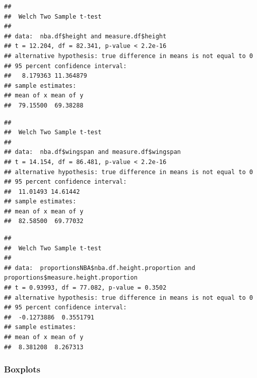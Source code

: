 \documentclass[]{article}
\newenvironment{Shaded}{\begin{snugshade}}{\end{snugshade}}
\newcommand{\DataTypeTok}[1]{\textcolor[rgb]{0.13,0.29,0.53}{#1}}
\newcommand{\KeywordTok}[1]{\textcolor[rgb]{0.13,0.29,0.53}{\textbf{#1}}}
\newcommand{\NormalTok}[1]{#1}
\newcommand{\OperatorTok}[1]{\textcolor[rgb]{0.81,0.36,0.00}{\textbf{#1}}}
\newcommand{\OtherTok}[1]{\textcolor[rgb]{0.56,0.35,0.01}{#1}}
\begin{document}
\begin{verbatim}
## 
##  Welch Two Sample t-test
## 
## data:  nba.df$height and measure.df$height
## t = 12.204, df = 82.341, p-value < 2.2e-16
## alternative hypothesis: true difference in means is not equal to 0
## 95 percent confidence interval:
##   8.179363 11.364879
## sample estimates:
## mean of x mean of y 
##  79.15500  69.38288
\end{verbatim}

\begin{Shaded}
\end{Shaded}

\begin{verbatim}
## 
##  Welch Two Sample t-test
## 
## data:  nba.df$wingspan and measure.df$wingspan
## t = 14.154, df = 86.481, p-value < 2.2e-16
## alternative hypothesis: true difference in means is not equal to 0
## 95 percent confidence interval:
##  11.01493 14.61442
## sample estimates:
## mean of x mean of y 
##  82.58500  69.77032
\end{verbatim}

\begin{Shaded}
\end{Shaded}

\begin{verbatim}
## 
##  Welch Two Sample t-test
## 
## data:  proportionsNBA$nba.df.height.proportion and proportions$measure.height.proportion
## t = 0.93993, df = 77.082, p-value = 0.3502
## alternative hypothesis: true difference in means is not equal to 0
## 95 percent confidence interval:
##  -0.1273886  0.3551791
## sample estimates:
## mean of x mean of y 
##  8.381208  8.267313
\end{verbatim}

\subsubsection{Boxplots}
\label{sec:boxplots}
\end{document}
